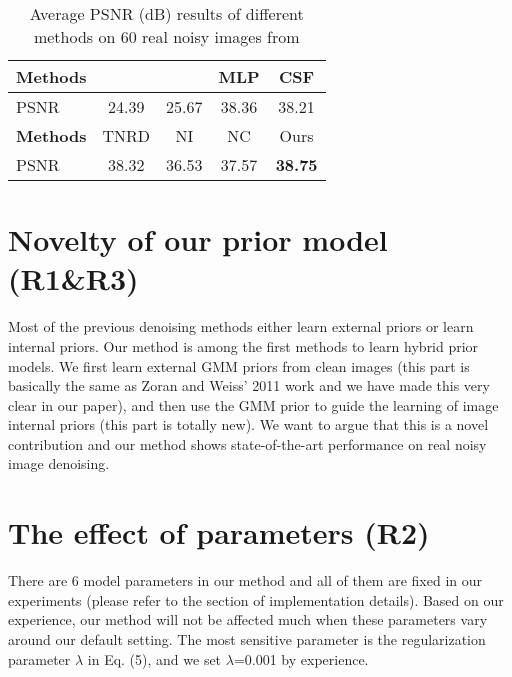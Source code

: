 \documentclass[10pt,twocolumn,letterpaper]{article}
\begin{document}
\begin{table}[h!]
\begin{center}
\caption{Average PSNR (dB) results of different methods on 60 real noisy images from \cite{Nam2016A}}
\begin{tabular}{|l|c|c|c|c|}
  \hline
  \textbf{Methods}                             &\cite{Makitalo2013Optimal}          &\cite{Salmon}       &MLP &CSF        \\
  \hline
  PSNR                    &  24.39                     &   25.67 &38.36 &38.21                           \\
  \hline
  \textbf{Methods}                             &TNRD          &NI       &NC &Ours        \\
  \hline
  PSNR                    &  38.32                     &   36.53 &37.57 &\textbf{38.75}                           \\
  \hline
\end{tabular}
\end{center}
\label{tab:1}
\end{table}

\vspace{-9mm}
\section{Novelty of our prior model (R1\&R3)}
Most of the previous denoising methods either learn external priors or learn internal priors. Our method is among the first methods to learn hybrid prior models. We first learn external GMM priors from clean images (this part is basically the same as Zoran and Weiss' 2011 work and we have made this very clear in our paper), and then use the GMM prior to guide the learning of image internal priors (this part is totally new). We want to argue that this is a novel contribution and our method shows state-of-the-art performance on real noisy image denoising.

\section{The effect of parameters (R2)}
There are 6 model parameters in our method and all of them are fixed in our experiments (please refer to the section of implementation details). Based on our experience, our method will not be affected much when these parameters vary around our default setting. The most sensitive parameter is the regularization parameter $\lambda$ in Eq. (5), and we set $\lambda$=0.001 by experience.
\end{document}
